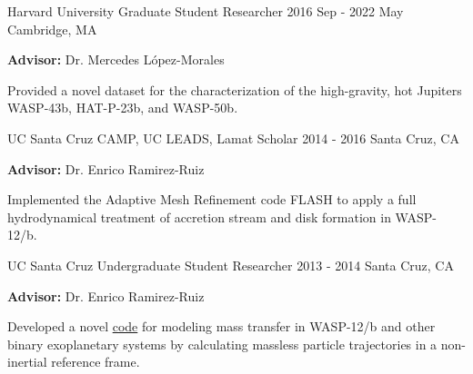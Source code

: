 

\begin{cventries}

  \cventry
    {Harvard University} %
    {Graduate Student Researcher} %
    {2016 Sep - 2022 May} %
    {Cambridge, MA} %
    {
        \begin{cvitems} %
            \item[] \textbf{Advisor:} Dr. Mercedes López-Morales
            \item[] Provided a novel dataset for the characterization of the high-gravity, hot Jupiters WASP-43b, HAT-P-23b, and WASP-50b.
        \end{cvitems}
    }
    
  \cventry
    {UC Santa Cruz} %
    {CAMP, UC LEADS, Lamat Scholar} %
    {2014 - 2016} %
    {Santa Cruz, CA} %
    {
        \begin{cvitems} %
            \item[] \textbf{Advisor:} Dr. Enrico Ramirez-Ruiz
            \item[] Implemented the Adaptive Mesh Refinement code FLASH to apply a full hydrodynamical treatment of
       accretion stream and disk formation in WASP-12/b.
        \end{cvitems}
    }
    
  \cventry
    {UC Santa Cruz} %
    {Undergraduate Student Researcher} %
    {2013 - 2014} %
    {Santa Cruz, CA} %
    {
        \begin{cvitems} %
            \item[] \textbf{Advisor:} Dr. Enrico Ramirez-Ruiz
            \item[] Developed a novel \href{https://github.com/icweaver/particle_trajectory}{code} for modeling mass
  transfer in WASP-12/b and other binary exoplanetary systems by calculating massless particle trajectories in a non-inertial reference frame.
        \end{cvitems}
    }
    
\end{cventries}